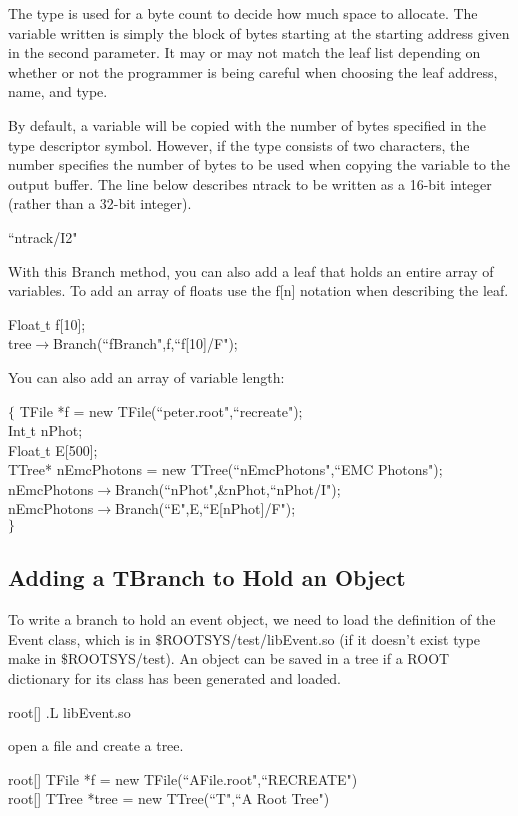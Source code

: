 \documentclass[12pt,a4paper]{article}
\begin{document}
The type is used for a byte count to decide how much space to allocate. The variable written is simply the block of bytes starting at the starting address given in the second parameter. It may or may not match the leaf list depending on whether or not the programmer is being careful when choosing the leaf address, name, and type.

By default, a variable will be copied with the number of bytes specified in the type descriptor symbol. However, if the type consists of two characters, the number specifies the number of bytes to be used when copying the variable to the output buffer. The line below describes ntrack to be written as a 16-bit integer (rather than a 32-bit integer).

``ntrack/I2"

With this Branch method, you can also add a leaf that holds an entire array of variables. To add an array of floats use the f[n] notation when describing the leaf.

Float$\_$t f[10]; \\
tree$\rightarrow$Branch(``fBranch",f,``f[10]/F");

You can also add an array of variable length:

$\{$
TFile *f = new TFile(``peter.root",``recreate"); \\
Int$\_$t nPhot; \\
Float$\_$t E[500]; \\
TTree* nEmcPhotons = new TTree(``nEmcPhotons",``EMC Photons"); \\
nEmcPhotons$\rightarrow$Branch(``nPhot",$\&$nPhot,``nPhot/I"); \\
nEmcPhotons$\rightarrow$Branch(``E",E,``E[nPhot]/F"); \\
$\}$

\subsection{Adding a TBranch to Hold an Object}
To write a branch to hold an event object, we need to load the definition of the Event class, which is in $\$$ROOTSYS/test/libEvent.so (if it doesn’t exist type make in $\$$ROOTSYS/test). An object can be saved in a tree if a ROOT dictionary for its class has been generated and loaded.

root[] .L libEvent.so

open a file and create a tree.

root[] TFile *f = new TFile(``AFile.root",``RECREATE") \\
root[] TTree *tree = new TTree(``T",``A Root Tree")
\end{document}
